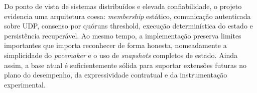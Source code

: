 \documentclass[runningheads]{llncs}
\begin{document}
Do ponto de vista de sistemas distribu\'idos e elevada confiabilidade, o projeto evidencia uma arquitetura coesa: \textit{membership} est\'atico, comunica\c{c}\~ao autenticada sobre UDP, consenso por qu\'oruns threshold, execu\c{c}\~ao determin\'istica do estado e persist\^encia recuper\'avel. Ao mesmo tempo, a implementa\c{c}\~ao preserva limites importantes que importa reconhecer de forma honesta, nomeadamente a simplicidade do \textit{pacemaker} e o uso de \textit{snapshots} completos de estado. Ainda assim, a base atual \'e suficientemente s\'olida para suportar extens\~oes futuras no plano do desempenho, da expressividade contratual e da instrumenta\c{c}\~ao experimental.
\end{document}
